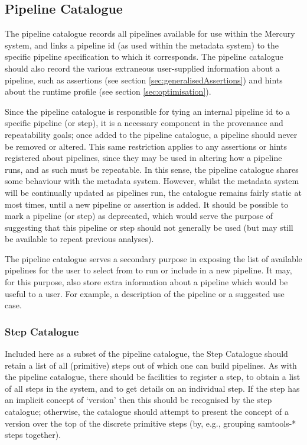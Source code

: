 \documentclass[10pt,a4paper]{article}
\newcommand{\npar}{\par\noindent\space}
\begin{document}
\subsection{Pipeline Catalogue}
\npar The pipeline catalogue records all pipelines available for use within the Mercury system, and links a pipeline id (as used within the metadata system) to the specific pipeline specification to which it corresponds. The pipeline catalogue should also record the various extraneous user-supplied information about a pipeline, such as assertions (see section \ref{sec:generalisedAssertions}) and hints about the runtime profile (see section \ref{sec:optimisation}).
\npar Since the pipeline catalogue is responsible for tying an internal pipeline id to a specific pipeline (or step), it is a necessary component in the provenance and repeatability goals; once added to the pipeline catalogue, a pipeline should never be removed or altered. This same restriction applies to any assertions or hints registered about pipelines, since they may be used in altering how a pipeline runs, and as such must be repeatable. In this sense, the pipeline catalogue shares some behaviour with the metadata system. However, whilst the metadata system will be continually updated as pipelines run, the catalogue remains fairly static at most times, until a new pipeline or assertion is added. It should be possible to mark a pipeline (or step) as deprecated, which would serve the purpose of suggesting that this pipeline or step should not generally be used (but may still be available to repeat previous analyses).
\npar The pipeline catalogue serves a secondary purpose in exposing the list of available pipelines for the user to select from to run or include in a new pipeline. It may, for this purpose, also store extra information about a pipeline which would be useful to a user. For example, a description of the pipeline or a suggested use case.

\subsubsection{Step Catalogue}
\npar Included here as a subset of the pipeline catalogue, the Step Catalogue should retain a list of all (primitive) steps out of which one can build pipelines. As with the pipeline catalogue, there should be facilities to register a step, to obtain a list of all steps in the system, and to get details on an individual step. If the step has an implicit concept of `version' then this should be recognised by the step catalogue; otherwise, the catalogue should attempt to present the concept of a version over the top of the discrete primitive steps (by, e.g., grouping samtools-* steps together).
\end{document}
